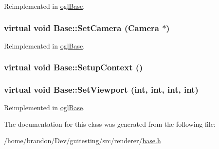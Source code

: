 Reimplemented in \hyperlink{classogl_base_07bd06c4bda42521313f56fcac5b7203}{oglBase}.\hypertarget{class_base_3502b98c0b0a3a8c4e4dc34fad149087}{
\subsubsection[{SetCamera}]{\setlength{\rightskip}{0pt plus 5cm}virtual void Base::SetCamera ({\bf Camera} $\ast$)}}
\label{class_base_3502b98c0b0a3a8c4e4dc34fad149087}




Reimplemented in \hyperlink{classogl_base_670c661d28fb47da29f4a7ba2ea39f87}{oglBase}.\hypertarget{class_base_71edd753368b895321786bd11a9784df}{
\subsubsection[{SetupContext}]{\setlength{\rightskip}{0pt plus 5cm}virtual void Base::SetupContext ()}}
\label{class_base_71edd753368b895321786bd11a9784df}


\hypertarget{class_base_1716db3ad36a8cbb807c9096899b7264}{
\subsubsection[{SetViewport}]{\setlength{\rightskip}{0pt plus 5cm}virtual void Base::SetViewport (int, \/  int, \/  int, \/  int)}}
\label{class_base_1716db3ad36a8cbb807c9096899b7264}




Reimplemented in \hyperlink{classogl_base_ea045b4b3e3db04be98919a4cbec22bc}{oglBase}.

The documentation for this class was generated from the following file:\begin{CompactItemize}
\item 
/home/brandon/Dev/guitesting/src/renderer/\hyperlink{base_8h}{base.h}\end{CompactItemize}
